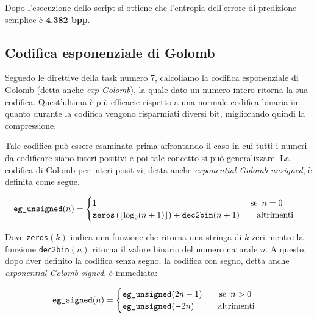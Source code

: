 \noindent Dopo l'esecuzione dello script si ottiene che l'entropia dell'errore di predizione semplice è \textbf{4.382 bpp}.



\vspace{15px}\subsection{Codifica esponenziale di Golomb}\label{exp-golomb}
Seguedo le direttive della task numero 7, calcoliamo la codifica esponenziale di Golomb (detta anche \textsl{exp-Golomb}), la quale dato un numero intero ritorna la sua codifica. Quest'ultima è più efficacie rispetto a una normale codifica binaria in quanto durante la codifica vengono risparmiati diversi bit, migliorando quindi la compressione. 

Tale codifica può essere esaminata prima affrontando il caso in cui tutti i numeri da codificare siano interi positivi e poi tale concetto si può generalizzare. La codifica di Golomb per interi positivi, detta anche \textsl{exponential Golomb unsigned}, è definita come segue.

\begin{gather*}
    \text{\texttt{eg\_unsigned}}(n) =
    \begin{cases}
        1 \hspace{180px} \text{se } \, n = 0 \\
        \texttt{zeros}\left( \left\lfloor \log_2(n + 1) \right\rfloor \right) + \texttt{dec2bin}(n + 1) \hspace{20px} \text{altrimenti}
    \end{cases}
\end{gather*}

\noindent Dove \texttt{zeros}$(k)$ indica una funzione che ritorna una stringa di $k$ zeri mentre la funzione \texttt{dec2bin}$(n)$ ritorna il valore binario del numero naturale $n$. A questo, dopo aver definito la codifica senza segno, la codifica con segno, detta anche \textsl{exponential Golomb signed}, è immediata:

\begin{gather*}
    \text{\texttt{eg\_signed}}(n) =
    \begin{cases}
        \text{\texttt{eg\_unsigned}}(2n - 1) \hspace{20px} \text{se } \, n > 0 \\
        \text{\texttt{eg\_unsigned}}(-2n) \hspace{28px} \text{altrimenti}
    \end{cases}
\end{gather*}

